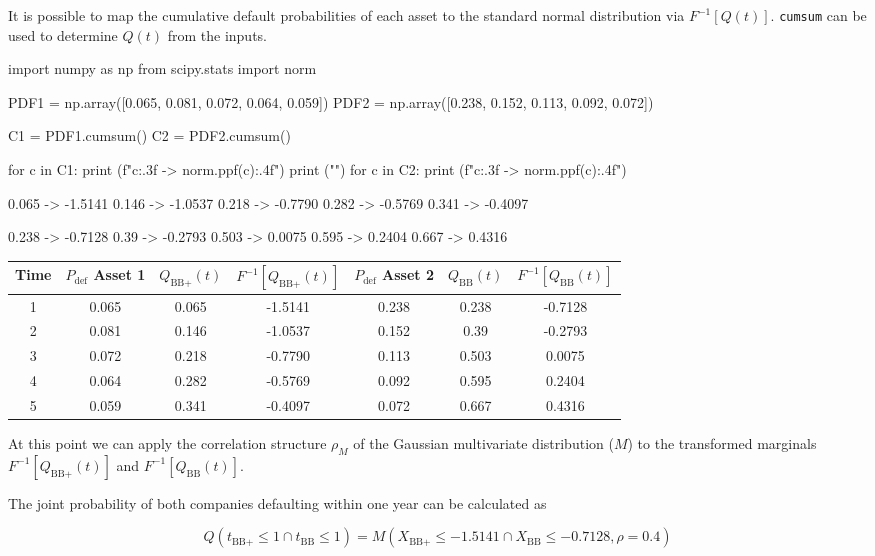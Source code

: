 \cprotEnv\begin{solution}
It is possible to map the cumulative default probabilities of each asset to the standard normal distribution via $F^{-1}[Q(t)]$.
\texttt{cumsum} can be used to determine $Q(t)$ from the inputs.

\begin{ipython}
import numpy as np
from scipy.stats import norm

PDF1 = np.array([0.065, 0.081, 0.072, 0.064, 0.059])
PDF2 = np.array([0.238, 0.152, 0.113, 0.092, 0.072])

C1 = PDF1.cumsum()
C2 = PDF2.cumsum()

for c in C1:
    print (f"{c:.3f} -> {norm.ppf(c):.4f}")
print ("")
for c in C2:
    print (f"{c:.3f} -> {norm.ppf(c):.4f}")
\end{ipython}
\begin{ioutput}
0.065 -> -1.5141
0.146 -> -1.0537
0.218 -> -0.7790
0.282 -> -0.5769
0.341 -> -0.4097

0.238 -> -0.7128
0.39 -> -0.2793
0.503 -> 0.0075
0.595 -> 0.2404
0.667 -> 0.4316
\end{ioutput}

\begin{table}[htbp]
\centering
\begin{tabular}{|c|c|c|c|c|c|c|}
\hline
Time & $P_{\mathrm{def}}$ Asset 1 & $Q_{\textrm{BB+}}(t)$ & $F^{-1}[Q_{\textrm{BB+}}(t)]$ & $P_{\mathrm{def}}$ Asset 2 & $Q_{\textrm{BB}}(t)$ & $F^{-1}[Q_{\textrm{BB}}(t)]$\\[5 pt]
\hline
\hline
1 & 0.065 & 0.065 & -1.5141 & 0.238 & 0.238 & -0.7128\\
2 & 0.081 & 0.146 & -1.0537 & 0.152 & 0.39 & -0.2793\\
3 & 0.072 & 0.218 & -0.7790 & 0.113 & 0.503 & 0.0075\\
4 & 0.064 & 0.282 & -0.5769 & 0.092 & 0.595 & 0.2404\\
5 & 0.059 & 0.341 & -0.4097 & 0.072 & 0.667 & 0.4316\\
\hline
\end{tabular}
\end{table}

At this point we can apply the correlation structure $\rho_M$ of the Gaussian multivariate distribution ($M$) to the transformed marginals $F^{-1}[Q_{\textrm{BB+}}(t)]$ and $F^{-1}[Q_{\textrm{BB}}(t)]$.

The joint probability of both companies defaulting within one year can be calculated as

\begin{equation*}
Q(t_{\textrm{BB+}}\leq 1 \cap t_{\textrm{BB}}\leq 1) = M(X_{\textrm{BB+}}\leq -1.5141 \cap X_{\textrm{BB}}\leq -0.7128, \rho=0.4)
\end{equation*}


\end{solution}
